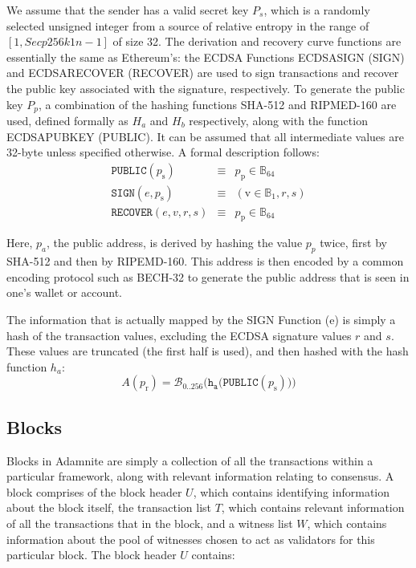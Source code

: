 \documentclass[conference]{IEEEtran}
\begin{document}
We assume that the sender has a valid secret key $P_s$, which is a randomly selected unsigned integer from a source of relative entropy in the range of $[1, Secp256k1n -1]$ of size 32. The derivation and recovery curve functions are essentially the same as Ethereum's: the ECDSA Functions ECDSASIGN (SIGN) and ECDSARECOVER (RECOVER) are used to sign transactions and recover the public key associated with the signature, respectively. To generate the public key $P_p$, a combination of the hashing functions SHA-512 and RIPMED-160 are used, defined formally as $H_a$ and $H_b$ respectively, along with the function ECDSAPUBKEY (PUBLIC). It can be assumed that all intermediate values are 32-byte unless specified otherwise. A formal description follows:
\begin{eqnarray}
\mathtt{PUBLIC}(p_{\mathrm{s}}) & \equiv & p_{\mathrm{p}} \in \mathbb{B}_{64} \\
\mathtt{SIGN}(e,p_{\mathrm{s}}) & \equiv & (\mathrm{v} \in \mathbb{B}_{1}, r, s)\\
\mathtt{RECOVER} (e, v, r, s) & \equiv & p_{\mathrm{p}}
\in \mathbb{B}_{64}
\end{eqnarray}

 Here, $p_a$, the public address, is derived by hashing the value $p_p$ twice, first by SHA-512 and then by RIPEMD-160. This address is then encoded by a common encoding protocol such as BECH-32 to generate the public address that is seen in one's wallet or account.

 The information that is actually mapped by the SIGN Function (e) is simply a hash of the transaction values, excluding the ECDSA signature values $r$ and $s$. These values are truncated (the first half is used), and then hashed with the hash function $h_a$:
\begin{equation}
A(p_{\mathrm{r}}) = \mathcal{B}_{0..256}\big(\mathtt{h_a}\big( \mathtt{PUBLIC}(p_{\mathrm{s}}) \big) \big)
\end{equation}

\subsection {Blocks}
Blocks in Adamnite are simply a collection of all the transactions within a particular framework, along with relevant information relating to consensus. A block comprises of the block header $U$, which contains identifying information about the block itself, the transaction list $T$, which contains relevant information of all the transactions that in the block, and a witness list $W$, which contains information about the pool of witnesses chosen to act as validators for this particular block. The block header $U$ contains:
\end{document}
